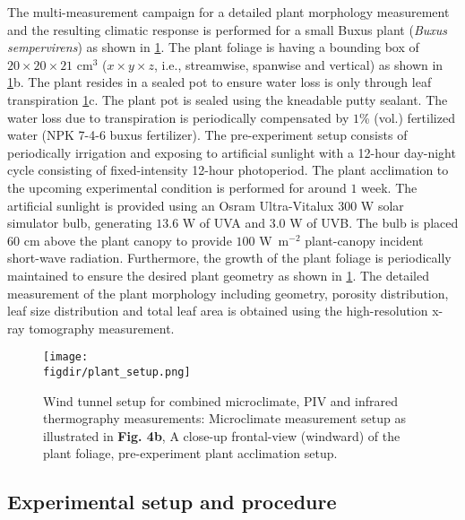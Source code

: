 The multi-measurement campaign for a detailed plant morphology measurement and the resulting climatic response is performed for a small Buxus plant (\textit{Buxus sempervirens}) as shown in \cref{fig:plant_setup}. The plant foliage is having a bounding box of $20\times20\times21$ cm$^3$ ($x\times y \times z$, i.e., streamwise, spanwise and vertical) as shown in \cref{fig:plant_setup}b. The plant resides in a sealed pot to ensure water loss is only through leaf transpiration \cref{fig:plant_setup}c. The plant pot is sealed using the kneadable putty sealant. The water loss due to transpiration is periodically compensated by $1$\% (vol.) fertilized water (NPK 7-4-6 buxus fertilizer). The pre-experiment setup consists of periodically irrigation and exposing to artificial sunlight with a 12-hour day-night cycle consisting of fixed-intensity 12-hour photoperiod. The plant acclimation to the upcoming experimental condition is performed for around $1$ week. The artificial sunlight is provided using an Osram Ultra-Vitalux $300$ W solar simulator bulb, generating $13.6$ W of UVA and $3.0$ W of UVB. The bulb is placed $60$ cm above the plant canopy to provide $100$ W~m$^{-2}$ plant-canopy incident short-wave radiation. Furthermore, the growth of the plant foliage is periodically maintained to ensure the desired plant geometry as shown in \cref{fig:plant_setup}. The detailed measurement of the plant morphology including geometry, porosity distribution, leaf size distribution and total leaf area is obtained using the high-resolution x-ray tomography measurement.

\begin{figure}[t]
	\centering
	\texttt{[image: \\figdir/plant\_setup.png]}
	\caption{Wind tunnel setup for combined microclimate, PIV and infrared thermography measurements:  Microclimate measurement setup as illustrated in \textbf{Fig. 4b},  A close-up frontal-view (windward) of the plant foliage,  pre-experiment plant acclimation setup.}
	\label{fig:plant_setup}
\end{figure}


\subsection{Experimental setup and procedure}

